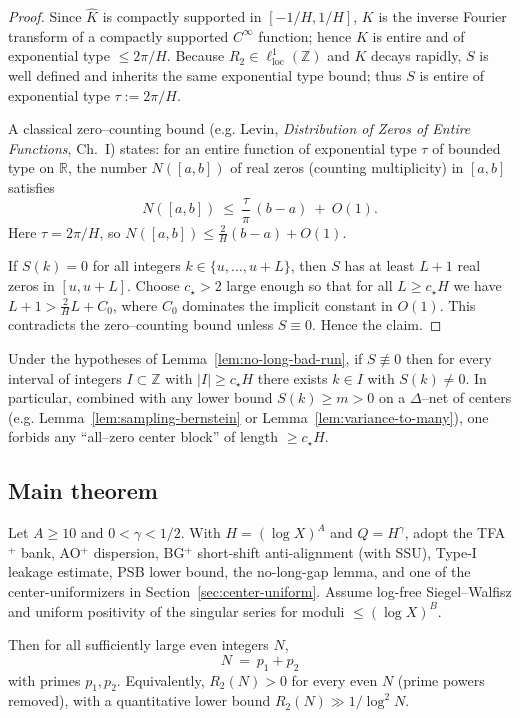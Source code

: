 \begin{proof}
Since $\widehat K$ is compactly supported in $[-1/H,1/H]$, $K$ is the inverse Fourier transform of a compactly supported $C^\infty$ function; hence $K$ is entire and of exponential type $\le 2\pi/H$. 
Because $R_2\in \ell^1_{\mathrm{loc}}(\mathbb Z)$ and $K$ decays rapidly, $S$ is well defined and inherits the same exponential type bound; thus $S$ is entire of exponential type $\tau:=2\pi/H$.

A classical zero–counting bound (e.g. Levin, \emph{Distribution of Zeros of Entire Functions}, Ch.~I) states: for an entire function of exponential type $\tau$ of bounded type on $\mathbb R$, the number $N([a,b])$ of real zeros (counting multiplicity) in $[a,b]$ satisfies
\[
N([a,b])\ \le\ \frac{\tau}{\pi}\,(b-a)\ +\ O(1).
\]
Here $\tau=2\pi/H$, so $N([a,b])\le \frac{2}{H}(b-a)+O(1)$.

If $S(k)=0$ for all integers $k\in\{u,\dots,u+L\}$, then $S$ has at least $L+1$ real zeros in $[u,u+L]$. 
Choose $c_\star>2$ large enough so that for all $L\ge c_\star H$ we have $L+1>\frac{2}{H}L+C_0$, where $C_0$ dominates the implicit constant in $O(1)$. This contradicts the zero–counting bound unless $S\equiv 0$. 
Hence the claim.
\end{proof}

\begin{corollary}\label{cor:no-long-bad-run}
Under the hypotheses of Lemma~\ref{lem:no-long-bad-run}, if $S\not\equiv 0$ then for every interval of integers $I\subset\mathbb Z$ with $|I|\ge c_\star H$ there exists $k\in I$ with $S(k)\ne 0$.
In particular, combined with any lower bound $S(k)\ge m>0$ on a $\Delta$–net of centers (e.g. Lemma~\ref{lem:sampling-bernstein} or Lemma~\ref{lem:variance-to-many}), one forbids any “all–zero center block” of length $\ge c_\star H$.
\end{corollary}

\subsection{Main theorem}\label{subsec:main-theorem}

\begin{theorem}\label{thm:main}
Let $A\ge 10$ and $0<\gamma<1/2$.
With $H=(\log X)^A$ and $Q=H^\gamma$, adopt the TFA$^+$ bank, AO$^+$ dispersion, BG$^+$ short-shift anti-alignment (with SSU), Type-I leakage estimate, PSB lower bound, the no-long-gap lemma, and one of the center-uniformizers in Section~\ref{sec:center-uniform}. Assume log-free Siegel–Walfisz and uniform positivity of the singular series for moduli $\le (\log X)^B$.

Then for all sufficiently large even integers $N$,
\[
  N \ =\ p_1 + p_2
\]
with primes $p_1,p_2$.
Equivalently, $R_{2}(N)>0$ for every even $N$ (prime powers removed), with a quantitative lower bound $R_{2}(N)\gg 1/\log^2 N$.
\end{theorem}

